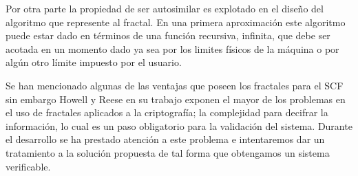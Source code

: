 Por otra parte la propiedad de ser autosimilar es explotado en el dise\~no del algoritmo que represente al fractal. En una primera aproximaci\'on este algoritmo puede estar dado en t\'erminos de una funci\'on recursiva, infinita, que debe ser acotada en un momento dado ya sea por los limites f\'isicos de la m\'aquina o por alg\'un otro l\'imite impuesto por el usuario. 

Se han mencionado algunas de las ventajas que poseen los fractales para el SCF sin embargo Howell y Reese \cite{Howell} en su trabajo exponen el mayor de los problemas en el uso de fractales aplicados a la criptograf\'ia; la complejidad para decifrar la informaci\'on, lo cual es un paso obligatorio para la validaci\'on del sistema. Durante el desarrollo se ha prestado atenci\'on a este problema e intentaremos dar un tratamiento a la soluci\'on propuesta de tal forma que obtengamos un sistema verificable.


